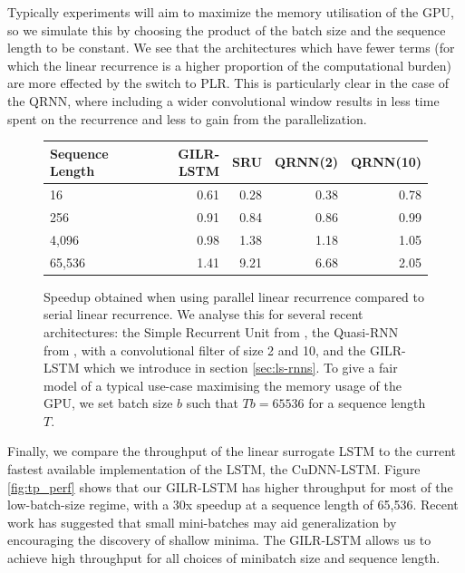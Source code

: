 \documentclass{article}
\begin{document}
Typically experiments will aim to maximize the memory
utilisation of the GPU, so we simulate this by choosing the product of the batch
size and the sequence length to be constant. We see that the architectures which
have fewer terms (for which the linear recurrence is a higher proportion of the
computational burden) are more effected by the switch to PLR.  This is
particularly clear in the case of the QRNN, where including a wider
convolutional window results in less time spent on the recurrence and less to
gain from the parallelization.
\begin{figure}
\begin{center}
  \begin{tabular}{@{}lrrrr@{}}
    \label{table:rnn-throughput}
Sequence Length & GILR-LSTM & SRU & QRNN(2) & QRNN(10)\\ \midrule
16 & 0.61 & 0.28 & 0.38 & 0.78\\
256 & 0.91 & 0.84 & 0.86 & 0.99\\
4,096 & 0.98 & 1.38 & 1.18 & 1.05\\
65,536 & 1.41 & 9.21 & 6.68 & 2.05\\ \bottomrule
  \end{tabular}
\end{center}
\caption{Speedup obtained when using parallel linear recurrence compared to
  serial linear recurrence. We analyse this for several recent architectures:
  the Simple Recurrent Unit from \cite{lei2017}, the Quasi-RNN from
  \cite{bradbury2017quasi}, with a convolutional filter of size 2 and 10, and
  the GILR-LSTM which we introduce in section \ref{sec:ls-rnns}. To give a fair
  model of a typical use-case maximising the memory usage of the GPU, we set
  batch size \(b\) such that \(Tb = 65536\) for a sequence length \(T\).}
\end{figure}

Finally, we compare the throughput of the linear surrogate LSTM to the current
fastest available implementation of the LSTM, the CuDNN-LSTM. Figure
\ref{fig:tp_perf} shows that our GILR-LSTM has higher throughput for most of the
low-batch-size regime, with a 30x speedup at a sequence length of 65,536. Recent
work \cite{keskar2017large} has suggested that small mini-batches may aid
generalization by encouraging the discovery of shallow minima. The GILR-LSTM
allows us to achieve high throughput for all choices of minibatch size and
sequence length.
\end{document}
